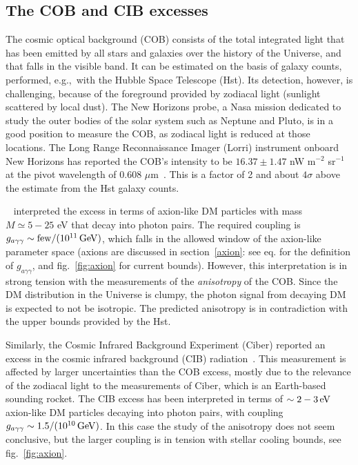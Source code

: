 \subsection{The COB and CIB excesses}\label{sec:COBCIB} 
The cosmic optical background (COB) consists of the total integrated light that has been emitted by all stars and galaxies over the history of the Universe, and that falls in the visible band. It can be estimated on the basis of galaxy counts, performed, e.g.,~with the Hubble Space Telescope ({\sc Hst}). 
Its detection, however, is challenging, because of the foreground provided by zodiacal light (sunlight scattered by local dust). 
The {\sc New Horizons} probe, a {\sc Nasa} mission dedicated to study the outer bodies of the solar system such as Neptune and Pluto, is in a good position to measure the COB, as zodiacal light is reduced at those locations.
The Long Range Reconnaissance Imager ({\sc Lorri}) instrument onboard {\sc New Horizons} has reported the COB's intensity to be $16.37 \pm 1.47$ nW m$^{-2}$ sr$^{-1}$ at the pivot wavelength of 0.608 $\mu$m~\cite{COBexcess}. 
This is a factor of 2 and about $4\sigma$ above the estimate from the {\sc Hst} galaxy counts. 

\medskip

~\cite{COBexcess} interpreted the excess 
in terms of axion-like DM particles with mass $M \simeq 5 - 25$ eV that decay into photon pairs. 
The required coupling is $g_{a\gamma\gamma} \sim \rm{few}/(10^{11}\,{\rm GeV})$, 
which falls in the allowed window of the axion-like parameter space 
(axions are discussed in section~\ref{axion}:
see eq. for the definition of $g_{a\gamma\gamma}$,
and fig.~\ref{fig:axion} for current bounds).
However, this interpretation is in strong tension with the measurements of the {\em anisotropy} of the COB. Since the DM distribution in the Universe is clumpy, the photon signal from decaying DM is expected to not be  isotropic. The predicted anisotropy is in contradiction with the upper bounds provided by the {\sc Hst}.

\medskip

Similarly, the Cosmic Infrared Background Experiment ({\sc Ciber}) reported an excess in the cosmic infrared background (CIB) radiation~\cite{CIBexcess}. This measurement is affected by larger uncertainties than the COB excess, mostly due to the relevance of the zodiacal light to the measurements of {\sc Ciber}, which is an Earth-based sounding rocket. 
The CIB excess has been interpreted in terms of $\sim2-3\,{\rm eV}$ axion-like DM particles decaying into photon pairs, with  coupling $g_{a\gamma\gamma} \sim 1.5 /(10^{10}\,{\rm GeV})$. 
In this case the study of the anisotropy does not seem conclusive, 
but the larger coupling is in tension with stellar cooling bounds, see fig.~\ref{fig:axion}.



